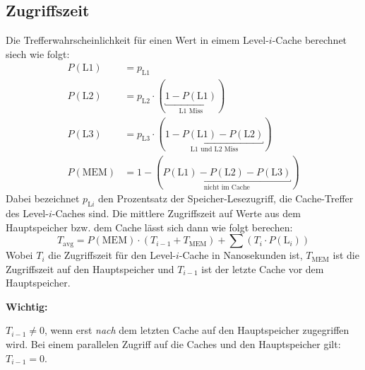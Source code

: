 \documentclass
[
	8pt,		%
	ngerman,	%
	a4paper,	%
	landscape,	%
	final		%
]{extarticle}
\DeclareMathOperator{\avg}{avg}
\newcommand*\important{\par\vspace{\abovedisplayskip}\textbf{Wichtig:}\par}
\begin{document}
\begin{multicols*}{4}
\subsection{Zugriffszeit}
Die Trefferwahrscheinlichkeit für einen Wert in eimem Level-$i$-Cache
berechnet siech wie folgt:
\begin{align*}
	P(\text{L1})  & = p_{\text{L1}}                                                                                \\
	P(\text{L2})  & = p_{\text{L2}} \cdot (\underbracket{1 - P(\text{L1})}_{\text{L1 Miss}})                       \\
	P(\text{L3})  & = p_{\text{L3}} \cdot (\underbracket{1 - P(\text{L1}) - P(\text{L2})}_{\text{L1 und L2 Miss}}) \\
	P(\text{MEM}) & = 1 - (\underbracket{P(\text{L1}) - P(\text{L2}) - P(\text{L3})}_{\text{nicht im Cache}})
\end{align*}
Dabei bezeichnet $p_{\text{L}i}$ den Prozentsatz der Speicher-Lesezugriff,
die Cache-Treffer des Level-$i$-Caches sind. Die mittlere Zugriffszeit auf
Werte aus dem Hauptspeicher bzw. dem Cache lässt sich dann wie folgt
berechen:
\[T_{\avg} = P(\text{MEM}) \cdot \left( T_{i - 1} + T_{\text{MEM}} \right) + \sum\left( T_{i} \cdot P(\text{L}_{i}) \right)\]
Wobei $T_{i}$ die Zugriffszeit für den Level-$i$-Cache in Nanosekunden ist,
$T_{\text{MEM}}$ ist die Zugriffszeit auf den Hauptspeicher und $T_{i - 1}$
ist der letzte Cache vor dem Hauptspeicher.
\important
$T_{i - 1} \neq 0$, wenn erst \emph{nach} dem letzten Cache auf den
Hauptspeicher zugegriffen wird. Bei einem parallelen Zugriff auf die Caches
und den Hauptspeicher gilt: $T_{i - 1} = 0$.

\end{multicols*}
\end{document}
